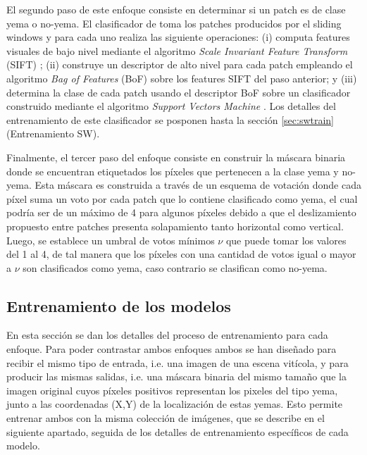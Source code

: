 \documentclass[a4paper,authoryear,review]{elsarticle}
\begin{document}
	El segundo paso de este enfoque consiste en determinar si un patch es de clase yema o no-yema. El clasificador de \citet{perez2017image} toma los patches producidos por el sliding windows y para cada uno realiza las siguiente operaciones: (i) computa features visuales de bajo nivel mediante el algoritmo \emph{Scale Invariant Feature Transform} (SIFT) \cite{lowe2004distinctive}; (ii) construye un descriptor de alto nivel para cada patch empleando el algoritmo \emph{Bag of Features} (BoF) \cite{csurka2004visual} sobre los features SIFT del paso anterior; y (iii) determina la clase de cada patch usando el descriptor BoF sobre un clasificador construido mediante el algoritmo \emph{Support Vectors Machine} \cite{vapnik2013nature}. Los detalles del entrenamiento de este clasificador se posponen hasta la sección \ref{sec:swtrain} (Entrenamiento SW).
	
	Finalmente, el tercer paso del enfoque consiste en construir la máscara binaria donde se encuentran etiquetados los píxeles que pertenecen a la clase yema y no-yema. Esta máscara es construida a través de un esquema de votación donde cada píxel suma un voto por cada patch que lo contiene clasificado como yema, el cual podría ser de un máximo de 4 para algunos píxeles debido a que el deslizamiento propuesto entre patches presenta solapamiento tanto horizontal como vertical. Luego, se establece un umbral de votos mínimos $\nu$ que puede tomar los valores del 1 al 4, de tal manera que los píxeles con una cantidad de votos igual o mayor a $\nu$ son clasificados como yema, caso contrario se clasifican como no-yema.
	
	
	
	\subsection{Entrenamiento de los modelos} 
	\label{sec:train}
	
	En esta sección se dan los detalles del proceso de entrenamiento para cada enfoque. Para poder contrastar ambos enfoques ambos se han diseñado para recibir el mismo tipo de entrada, i.e. una imagen de una escena vitícola, y para producir las mismas salidas, i.e. una máscara binaria del mismo tamaño que la imagen original cuyos píxeles positivos representan los pixeles del tipo yema, junto a las coordenadas (X,Y) de la localización de estas yemas. 
	Esto permite entrenar ambos con la misma colección de imágenes, que se describe en el siguiente apartado, seguida de los detalles de entrenamiento específicos de cada modelo.
	
\end{document}
